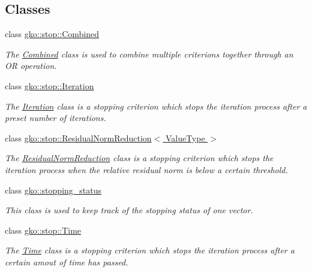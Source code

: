 \subsection*{Classes}
\begin{DoxyCompactItemize}
\item 
class \hyperlink{classgko_1_1stop_1_1Combined}{gko\+::stop\+::\+Combined}
\begin{DoxyCompactList}\small\item\em The \hyperlink{classgko_1_1stop_1_1Combined}{Combined} class is used to combine multiple criterions together through an OR operation. \end{DoxyCompactList}\item 
class \hyperlink{classgko_1_1stop_1_1Iteration}{gko\+::stop\+::\+Iteration}
\begin{DoxyCompactList}\small\item\em The \hyperlink{classgko_1_1stop_1_1Iteration}{Iteration} class is a stopping criterion which stops the iteration process after a preset number of iterations. \end{DoxyCompactList}\item 
class \hyperlink{classgko_1_1stop_1_1ResidualNormReduction}{gko\+::stop\+::\+Residual\+Norm\+Reduction$<$ Value\+Type $>$}
\begin{DoxyCompactList}\small\item\em The \hyperlink{classgko_1_1stop_1_1ResidualNormReduction}{Residual\+Norm\+Reduction} class is a stopping criterion which stops the iteration process when the relative residual norm is below a certain threshold. \end{DoxyCompactList}\item 
class \hyperlink{classgko_1_1stopping__status}{gko\+::stopping\+\_\+status}
\begin{DoxyCompactList}\small\item\em This class is used to keep track of the stopping status of one vector. \end{DoxyCompactList}\item 
class \hyperlink{classgko_1_1stop_1_1Time}{gko\+::stop\+::\+Time}
\begin{DoxyCompactList}\small\item\em The \hyperlink{classgko_1_1stop_1_1Time}{Time} class is a stopping criterion which stops the iteration process after a certain amout of time has passed. \end{DoxyCompactList}\end{DoxyCompactItemize}
